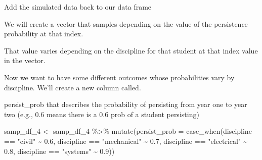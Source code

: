 \documentclass[
]{book}
\newenvironment{Shaded}{\begin{snugshade}}{\end{snugshade}}
\newcommand{\AttributeTok}[1]{\textcolor[rgb]{0.77,0.63,0.00}{#1}}
\newcommand{\DecValTok}[1]{\textcolor[rgb]{0.00,0.00,0.81}{#1}}
\newcommand{\FloatTok}[1]{\textcolor[rgb]{0.00,0.00,0.81}{#1}}
\newcommand{\FunctionTok}[1]{\textcolor[rgb]{0.00,0.00,0.00}{#1}}
\newcommand{\NormalTok}[1]{#1}
\newcommand{\OtherTok}[1]{\textcolor[rgb]{0.56,0.35,0.01}{#1}}
\newcommand{\SpecialCharTok}[1]{\textcolor[rgb]{0.00,0.00,0.00}{#1}}
\newcommand{\StringTok}[1]{\textcolor[rgb]{0.31,0.60,0.02}{#1}}
\begin{document}
Add the simulated data back to our data frame

\begin{Shaded}
\end{Shaded}

We will create a vector that samples depending on the value of the persistence probability at that index.

That value varies depending on the discipline for that student at that index value in the vector.

Now we want to have some different outcomes whose probabilities vary by discipline. We'll create a new column called.

persist\_prob that describes the probability of persisting from year one to year two (e.g., 0.6 means there is a 0.6 prob of a student persisting)

\begin{Shaded}
\begin{Highlighting}[]
\NormalTok{samp\_df\_4 }\OtherTok{\textless{}{-}}\NormalTok{ samp\_df\_4 }\SpecialCharTok{\%\textgreater{}\%} 
  \FunctionTok{mutate}\NormalTok{(}\AttributeTok{persist\_prob =} \FunctionTok{case\_when}\NormalTok{(discipline }\SpecialCharTok{==} \StringTok{"civil"} \SpecialCharTok{\textasciitilde{}} \FloatTok{0.6}\NormalTok{,}
\NormalTok{                                  discipline }\SpecialCharTok{==} \StringTok{"mechanical"} \SpecialCharTok{\textasciitilde{}} \FloatTok{0.7}\NormalTok{,}
\NormalTok{                                  discipline }\SpecialCharTok{==} \StringTok{"electrical"} \SpecialCharTok{\textasciitilde{}} \FloatTok{0.8}\NormalTok{,}
\NormalTok{                                  discipline }\SpecialCharTok{==} \StringTok{"systems"} \SpecialCharTok{\textasciitilde{}} \FloatTok{0.9}\NormalTok{))}
\end{Highlighting}
\end{Shaded}

\begin{Shaded}
\end{Shaded}
\end{document}
